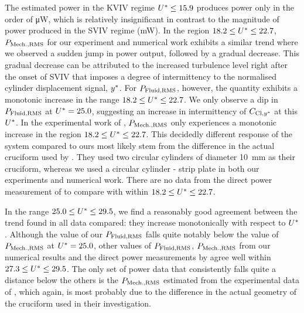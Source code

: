 \documentclass[oneside]{utmthesis}
\begin{document}
The estimated power in the KVIV regime $U^{*} \leq 15.9$ produces power only in the order of \si{\micro\watt}, which is relatively insignificant in contrast to the magnitude of power produced in the SVIV regime (mW). In the region $18.2 \leq U^{*} \leq 22.7$, $P_{\text{Mech.,RMS}}$ for our experiment and numerical work exhibits a similar trend where we observed a sudden jump in power output, followed by a gradual decrease. This gradual decrease can be attributed to the increased turbulence level right after the onset of SVIV that imposes a degree of intermittency to the normalised cylinder displacement signal, $y^{*}$. For $P_{\text{Fluid,RMS}}$, however, the quantity exhibits a monotonic increase in the range $18.2 \leq U^{*} \leq 22.7$. We only observe a dip in $P_{\text{Fluid,RMS}}$ at $U^{*} = 25.0$, suggesting an increase in intermittency of $C_{\text{Cl},y^{*}}$ at this $U^{*}$. In the experimental work of \citet{Nguyen2012}, $P_{\text{Mech.,RMS}}$ only experiences a monotonic increase in the region $18.2 \leq U^{*} \leq 22.7$. This decidedly different response of the system compared to ours most likely stem from the difference in the actual cruciform used by \citet{Nguyen2012}. They used two circular cylinders of diameter \SI{10}{\milli\metre} as their cruciform, whereas we used a circular cylinder - strip plate in both our experiments and numerical work. There are no data from the direct power measurement of \citet{Koide2013} to compare with within $18.2 \leq U^{*} \leq 22.7$.

In the range $25.0 \leq U^{*} \leq 29.5$, we find a reasonably good agreement between the trend found in all data compared: they increase monotonically with respect to $U^{*}$. Although the value of our $P_{\text{Fluid,RMS}}$ falls quite notably below the value of $P_{\text{Mech.,RMS}}$ at $U^{*} = 25.0$, other values of $P_{\text{Fluid,RMS}}$, $P_{\text{Mech.,RMS}}$ from our numerical results and the direct power measurements by \citet{Koide2013} agree well within $27.3 \leq U^{*} \leq 29.5$. The only set of power data that consistently falls quite a distance below the others is the $P_{\text{Mech.,RMS}}$ estimated from the experimental data of \citet{Nguyen2012}, which again, is most probably due to the difference in the actual geometry of the cruciform used in their investigation.
\end{document}
